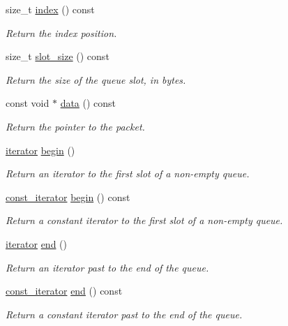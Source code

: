 \begin{DoxyCompactItemize}
size\+\_\+t \hyperlink{classpfq_1_1net__queue_a6f328cf50f038056f2b761bfaeca4c91}{index} () const
\begin{DoxyCompactList}\small\item\em Return the index position. \end{DoxyCompactList}\item 
size\+\_\+t \hyperlink{classpfq_1_1net__queue_a29b652b2c4e672bdfe65709483ad4319}{slot\+\_\+size} () const
\begin{DoxyCompactList}\small\item\em Return the size of the queue slot, in bytes. \end{DoxyCompactList}\item 
const void $\ast$ \hyperlink{classpfq_1_1net__queue_a83e4a9bb3f4625bb5e405b853c15eebf}{data} () const
\begin{DoxyCompactList}\small\item\em Return the pointer to the packet. \end{DoxyCompactList}\item 
\hyperlink{structpfq_1_1net__queue_1_1iterator}{iterator} \hyperlink{classpfq_1_1net__queue_a36d91779a4ac2a6e3f7e63ff8594ada7}{begin} ()
\begin{DoxyCompactList}\small\item\em Return an iterator to the first slot of a non-\/empty queue. \end{DoxyCompactList}\item 
\hyperlink{structpfq_1_1net__queue_1_1const__iterator}{const\+\_\+iterator} \hyperlink{classpfq_1_1net__queue_a8e2a7861bfcb61f48d902acbdc4fa411}{begin} () const
\begin{DoxyCompactList}\small\item\em Return a constant iterator to the first slot of a non-\/empty queue. \end{DoxyCompactList}\item 
\hyperlink{structpfq_1_1net__queue_1_1iterator}{iterator} \hyperlink{classpfq_1_1net__queue_acef930aef921f06803621af79f993b25}{end} ()
\begin{DoxyCompactList}\small\item\em Return an iterator past to the end of the queue. \end{DoxyCompactList}\item 
\hyperlink{structpfq_1_1net__queue_1_1const__iterator}{const\+\_\+iterator} \hyperlink{classpfq_1_1net__queue_ad563083d60d2b1b581d52ac2e25e8fff}{end} () const
\begin{DoxyCompactList}\small\item\em Return a constant iterator past to the end of the queue. \end{DoxyCompactList}\item 

\end{DoxyCompactItemize}
